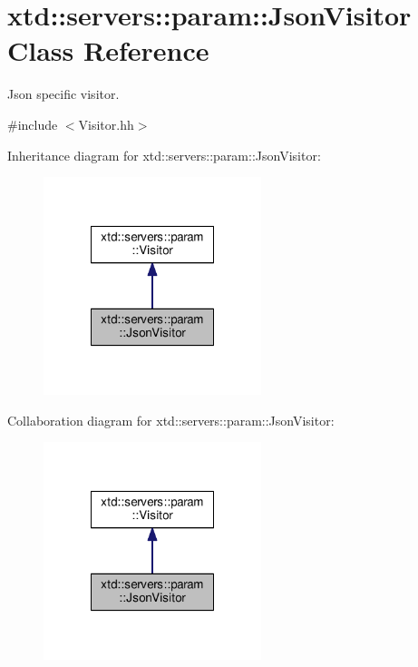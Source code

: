 \hypertarget{classxtd_1_1servers_1_1param_1_1JsonVisitor}{\section{xtd\-:\-:servers\-:\-:param\-:\-:Json\-Visitor Class Reference}
\label{classxtd_1_1servers_1_1param_1_1JsonVisitor}
}


Json specific visitor.  




{\ttfamily \#include $<$Visitor.\-hh$>$}



Inheritance diagram for xtd\-:\-:servers\-:\-:param\-:\-:Json\-Visitor\-:
\nopagebreak
\begin{figure}[H]
\begin{center}
\leavevmode
\includegraphics[width=180pt]{classxtd_1_1servers_1_1param_1_1JsonVisitor__inherit__graph}
\end{center}
\end{figure}


Collaboration diagram for xtd\-:\-:servers\-:\-:param\-:\-:Json\-Visitor\-:
\nopagebreak
\begin{figure}[H]
\begin{center}
\leavevmode
\includegraphics[width=180pt]{classxtd_1_1servers_1_1param_1_1JsonVisitor__coll__graph}
\end{center}
\end{figure}
